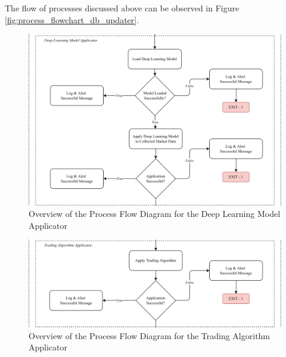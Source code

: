 The flow of processes discussed above can be observed 
in Figure \ref{fig:process_flowchart_db_updater}.

\begin{figure}[ht]
    \centering
    \includegraphics[width=1\textwidth]{./assets/Chapter_3/PFC/ProcessFlowchart_DataProcessor1.png}
    \caption{Overview of the Process Flow Diagram for the Deep Learning Model Applicator}
    \label{fig:process_flowchart_dp_model_applicator}
\end{figure}
\FloatBarrier

\begin{figure}[ht]
    \centering
    \includegraphics[width=1\textwidth]{./assets/Chapter_3/PFC/ProcessFlowchart_DataProcessor2.png}
    \caption{Overview of the Process Flow Diagram for the Trading Algorithm Applicator}
    \label{fig:process_flowchart_dp_trad_algo_applicator}
\end{figure}
\FloatBarrier

